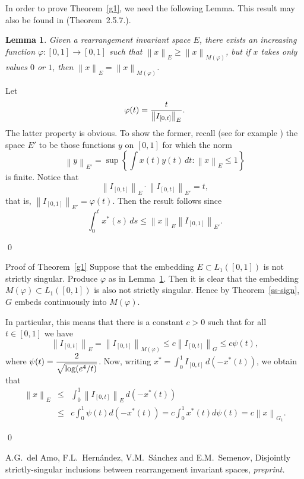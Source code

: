 \documentclass[numreferences]{kluwer}
\def\normo#1{\left\|#1\right\|}
\newtheorem{Lemma}[Theorem]{Lemma}
\begin{document}
\begin{article}
In order to prove Theorem~\ref{g1}, we need the following Lemma.  This result
may also be found in \cite{KPS} (Theorem~2.5.7.).

\begin{Lemma}
\label{M-embed}
Given a rearrangement invariant space $E$, there exists
an increasing function $\varphi:[0,1]\to[0,1]$ such that $\normo x_E \ge
\normo x_{M(\varphi)}$, but if $x$ takes only values $0$ or $1$, then
$\normo x_E = \normo x_{M(\varphi)}$.
\end{Lemma}

\begin{pf}
Let 
$$ \varphi(t) = {t\over \normo{I_{[0,t]}}_E} .$$
The latter property is obvious.  To show the former, recall (see for example
\cite{LT}) the
space $E'$ to be those functions $y$ on $[0,1]$ for which the
norm
$$ \normo y_{E'} = \sup\left\{ \int x(t) y(t) \, dt : \normo x_E \le 1
   \right\}$$
is finite.  Notice that
$$ \normo{I_{[0,t]}}_E \cdot \normo{I_{[0,t]}}_{E'} = t ,$$
that is, $\normo{I_{[0,1]}}_{E'} = \varphi(t) $.  Then the result follows
since
$$ \int_0^t x^*(s) \, ds
   \le \normo x_E \normo{I_{[0,1]}}_{E'} .$$
\end{pf}\qed

\begin{pf*}{Proof of Theorem~\ref{g1}}
Suppose that the embedding $E \subset L_1([0,1])$ is not strictly singular.
Produce $\varphi$ as in Lemma~\ref{M-embed}.  Then it is clear that the embedding
$M(\varphi) \subset L_1([0,1])$ is also not strictly singular.  Hence
by Theorem~\ref{ss-sign}, $G$ embeds continuously into $M(\varphi)$.

In particular, this means that there is a constant $c>0$ such that for
all $t \in [0,1]$ we have
$$ \normo{I_{[0,t]}}_E = \normo{I_{[0,t]}}_{M(\varphi)}
   \le c \normo{I_{[0,t]}}_G
   \le c \psi(t) ,$$
where $\psi(t) = \displaystyle {2 \over \sqrt{\log(e^4/t)}} $.
Now, writing $x^* = \int_0^1 I_{[0,t]} \, d(-x^*(t))$, we obtain that
\begin{eqnarray*}
   \normo x_E
   &\le&
   \int_0^1 \normo{I_{[0,t]}}_E \, d(-x^*(t)) \\
   &\le& c \int_0^1 \psi(t) d(-x^*(t))
   = c \int_0^1 x^*(t) d\psi(t) 
   = c \normo x_{G_1} .
\end{eqnarray*}
\end{pf*}\qed


\begin{thebibliography}{99}

 A.G.~del Amo, F.L.~Hern\'andez, V.M.~S\'anchez and E.M.~Semenov,
Disjointly strictly-singular inclusions between rearrangement invariant spaces,
{\em preprint.}


\end{thebibliography}
\end{article}
\end{document}
